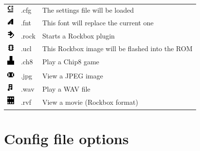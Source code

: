 \begin{center}
\begin{tabularx}{\textwidth}{llX}
\includegraphics[width=0.37cm]{appendix/images/icon-config.png} 
  & .cfg & The settings file will be loaded\\
\includegraphics[width=0.37cm]{appendix/images/icon-font.png} 
  & .fnt & This font will replace the current one\\
\includegraphics[width=0.37cm]{appendix/images/icon-rock.png} 
  & .rock & Starts a Rockbox plugin\\
\includegraphics[width=0.37cm]{appendix/images/icon-ucl.png} 
  & .ucl & This Rockbox image will be flashed into the ROM \\
\includegraphics[width=0.37cm]{appendix/images/icon-chip8.png} 
  & .ch8 & Play a Chip8 game \\
\includegraphics[width=0.37cm]{appendix/images/icon-image-file.png} 
  & .jpg & View a JPEG image \\
\includegraphics[width=0.37cm]{appendix/images/icon-wav-file.png} 
  & .wav & Play a WAV file \\
\includegraphics[width=0.37cm]{appendix/images/icon-movie-file.png} 
  & .rvf & View a movie (Rockbox format)\\\bottomrule
\end{tabularx}
\end{center}



\chapter{\label{ref:config_file_options}Config file options}


